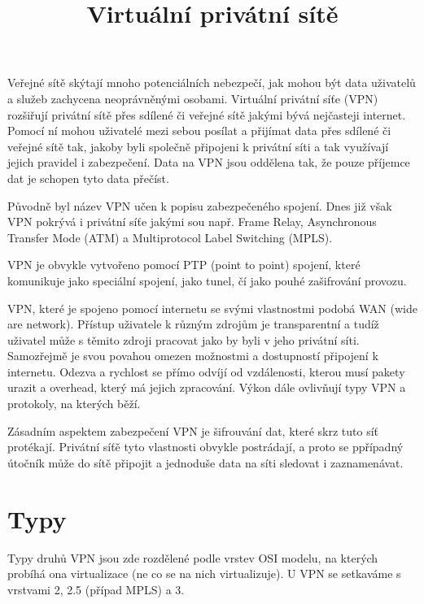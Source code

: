 \documentclass[thesis=B,czech]{FITthesis}[2012/06/26]
\title{Virtuální privátní sítě}
\begin{document}

\begin{introduction}
  \label{sec:uvod}

  Veřejné sítě skýtají mnoho potenciálních nebezpečí, jak mohou být data uživatelů a služeb zachycena neoprávněnými osobami.
  Virtuální privátní síťe (VPN) rozšiřují privátní sítě přes sdílené či veřejné sítě jakými bývá nejčasteji internet.
  Pomocí ní mohou uživatelé mezi sebou posílat a přijímat data přes sdílené či veřejné sítě tak, jakoby byli společně připojeni k privátní síti a tak využívají jejich pravidel i zabezpečení. \cite{cisco_intro}
  Data na VPN jsou oddělena tak, že pouze příjemce dat je schopen tyto data přečíst.  \cite{netgear_vpn_basics}

  Původně byl název VPN učen k popisu zabezpečeného spojení. Dnes již však VPN pokrývá i privátní síťe jakými sou např. Frame Relay, Asynchronous Transfer Mode (ATM) a Multiprotocol Label Switching (MPLS).

  VPN je obvykle vytvořeno pomocí PTP (point to point) spojení, které komunikuje jako speciální spojení, jako tunel, čí jako pouhé zašifrování provozu.

  VPN, které je spojeno pomocí internetu se svými vlastnostmi podobá WAN (wide are network). Přístup uživatele k různým zdrojům je transparentní a tudíž uživatel může s těmito zdroji pracovat jako by byli v jeho privátní síti. Samozřejmě je svou povahou omezen možnostmi a dostupností připojení k internetu. Odezva a rychlost se přímo odvíjí od vzdálenosti, kterou musí pakety urazit a overhead, který má jejich zpracování. Výkon dále ovlivňují typy VPN a protokoly, na kterých běží. \cite{microsoft_intro}

  Zásadním aspektem zabezpečení VPN je šifrouvání dat, které skrz tuto síť protékají. Privátní síťě tyto vlastnosti obvykle postrádají, a proto se ppřípadný útočník může do sítě připojit a jednoduše data na síti sledovat i zaznamenávat. \cite{netgear_vpn_basics}

\end{introduction}

\chapter{Typy}

  Typy druhů VPN jsou zde rozdělené podle vrstev OSI modelu, na kterých probíhá ona virtualizace (ne co se na nich virtualizuje). U VPN se setkaváme s vrstvami 2, 2.5 (případ MPLS) a 3.
\end{document}
